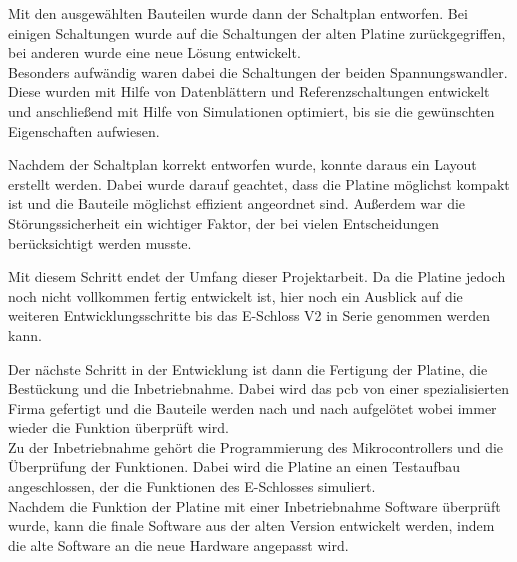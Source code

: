 Mit den ausgewählten Bauteilen wurde dann der Schaltplan entworfen. Bei einigen Schaltungen wurde auf die Schaltungen
der alten Platine zurückgegriffen, bei anderen wurde eine neue Lösung entwickelt. \\
Besonders aufwändig waren dabei die Schaltungen der beiden Spannungswandler. Diese wurden mit Hilfe von Datenblättern
und Referenzschaltungen entwickelt und anschließend mit Hilfe von Simulationen optimiert, bis sie die gewünschten
Eigenschaften aufwiesen. 

Nachdem der Schaltplan korrekt entworfen wurde, konnte daraus ein Layout erstellt werden. Dabei wurde darauf geachtet,
dass die Platine möglichst kompakt ist und die Bauteile möglichst effizient angeordnet sind. Außerdem war die 
Störungssicherheit ein wichtiger Faktor, der bei vielen Entscheidungen berücksichtigt werden musste.

Mit diesem Schritt endet der Umfang dieser Projektarbeit. Da die Platine jedoch noch nicht vollkommen fertig 
entwickelt ist, hier noch ein Ausblick auf die weiteren Entwicklungsschritte bis das E-Schloss V2 in Serie genommen
werden kann. 

Der nächste Schritt in der Entwicklung ist dann die Fertigung der Platine, die Bestückung und die Inbetriebnahme.
Dabei wird das \ac{pcb} von einer spezialisierten Firma gefertigt und die Bauteile werden nach und nach aufgelötet
wobei immer wieder die Funktion überprüft wird. \\
Zu der Inbetriebnahme gehört die Programmierung des Mikrocontrollers und die Überprüfung der Funktionen. Dabei
wird die Platine an einen Testaufbau angeschlossen, der die Funktionen des E-Schlosses simuliert. \\
Nachdem die Funktion der Platine mit einer Inbetriebnahme Software überprüft wurde, kann die finale Software
aus der alten Version entwickelt werden, indem die alte Software an die neue Hardware angepasst wird. 